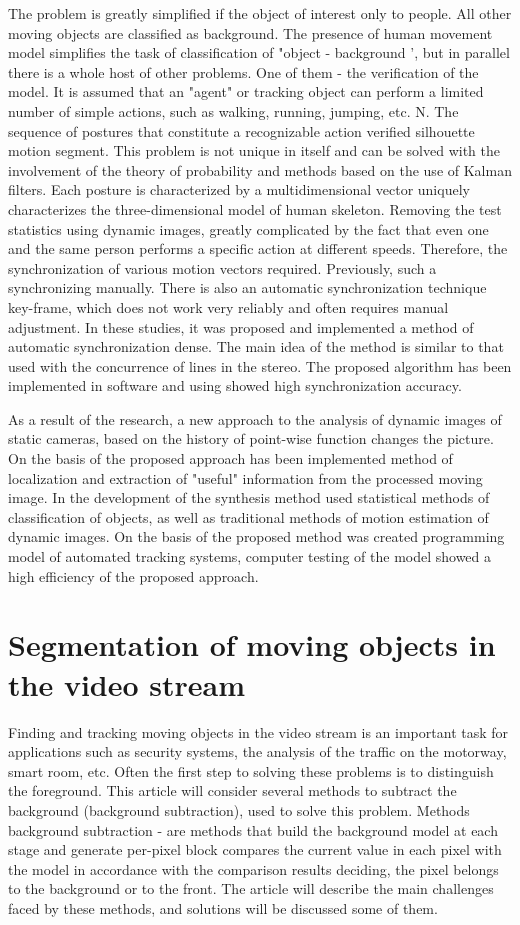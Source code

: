 The problem is greatly simplified if the object of interest only to people. All other moving objects are classified as background. The presence of human movement model simplifies the task of classification of "object - background ', but in parallel there is a whole host of other problems. One of them - the verification of the model. It is assumed that an "agent" or tracking object can perform a limited number of simple actions, such as walking, running, jumping, etc. N. The sequence of postures that constitute a recognizable action verified silhouette motion segment. This problem is not unique in itself and can be solved with the involvement of the theory of probability and methods based on the use of Kalman filters. Each posture is characterized by a multidimensional vector uniquely characterizes the three-dimensional model of human skeleton. Removing the test statistics using dynamic images, greatly complicated by the fact that even one and the same person performs a specific action at different speeds. Therefore, the synchronization of various motion vectors required.
Previously, such a synchronizing manually. There is also an automatic synchronization technique key-frame, which does not work very reliably and often requires manual adjustment. In these studies, it was proposed and implemented a method of automatic synchronization dense. The main idea of the method is similar to that used with the concurrence of lines in the stereo. The proposed algorithm has been implemented in software and using showed high synchronization accuracy.

As a result of the research, a new approach to the analysis of dynamic images of static cameras, based on the history of point-wise function changes the picture. On the basis of the proposed approach has been implemented method of localization and extraction of "useful" information from the processed moving image. In the development of the synthesis method used statistical methods of classification of objects, as well as traditional methods of motion estimation of dynamic images. On the basis of the proposed method was created programming model of automated tracking systems, computer testing of the model showed a high efficiency of the proposed approach.


\section{Segmentation of moving objects in the video stream}

Finding and tracking moving objects in the video stream is an important task for applications such as security systems, the analysis of the traffic on the motorway, smart room, etc. Often the first step to solving these problems is to distinguish the foreground. This article will consider several methods to subtract the background (background subtraction), used to solve this problem. Methods background subtraction - are methods that build the background model at each stage and generate per-pixel block compares the current value in each pixel with the model in accordance with the comparison results deciding, the pixel belongs to the background or to the front. The article will describe the main challenges faced by these methods, and solutions will be discussed some of them.

